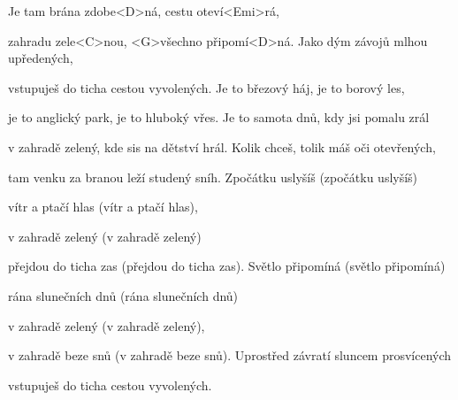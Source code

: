 

\zs
Je tam brána zdobe<D>ná, cestu oteví<Emi>rá,

zahradu zele<C>nou, <G>všechno připomí<D>ná.
\ks
\zs
Jako dým závojů mlhou upředených,

vstupuješ do ticha cestou vyvolených.
\ks
\zs
Je to březový háj, je to borový les,

je to anglický park, je to hluboký vřes.
\ks
\zs
Je to samota dnů, kdy jsi pomalu zrál

v zahradě zelený, kde sis na dětství hrál.
\ks
\zs
Kolik chceš, tolik máš oči otevřených,

tam venku za branou leží studený sníh.
\ks
\zs
Zpočátku uslyšíš (zpočátku uslyšíš)

vítr a ptačí hlas (vítr a ptačí hlas),

v zahradě zelený (v zahradě zelený)

přejdou do ticha zas (přejdou do ticha zas).
\ks
\zs
Světlo připomíná (světlo připomíná)

rána slunečních dnů (rána slunečních dnů)

v zahradě zelený (v zahradě zelený),

v zahradě beze snů (v zahradě beze snů).
\ks
\zs
Uprostřed závratí sluncem prosvícených

vstupuješ do ticha cestou vyvolených.
\ks
\kp






















